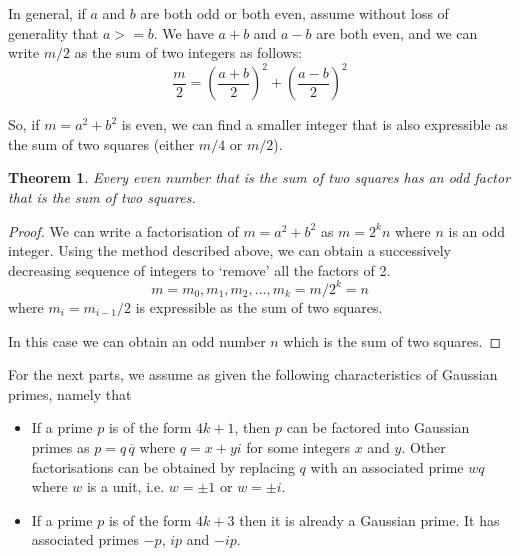 \documentclass[11pt]{amsart}
\newtheorem{theorem}{Theorem}[section]
\begin{document}
\vspace{1em}

In general, if $a$ and $b$ are both odd or both even, assume without loss of generality that $a >= b$. We have $a+b$ and $a-b$ are both even, and we can write $m/2$ as the sum of two integers as follows:
$$
\frac{m}{2} = \left(\frac{a+b}{2}\right)^2 + \left(\frac{a-b}{2}\right)^2
$$


\vspace{1em}

So, if $m = a^2 + b^2$ is even, we can find a smaller integer that is also expressible as the sum of two squares (either $m/4$ or $m/2$).


\vspace{1em}

\begin{theorem}
Every even number that is the sum of two squares has an odd factor that is the sum of two squares.
\end{theorem}

\begin{proof}
We can write a factorisation of $m = a^2 + b^2$ as $m = 2^k n$ where $n$ is an odd integer.
Using the method described above, we can obtain a successively decreasing sequence of integers to `remove' all the factors of 2.
$$
m = m_0 , m_1, m_2, \ldots, m_k = m/2^{k} =  n
$$
where $m_i = m_{i-1}/2$ is expressible as the sum of two squares.

In this case we can obtain an odd number $n$ which is the sum of two squares.
\end{proof}

\vspace{1em}

For the next parts, we assume as given the following characteristics of Gaussian primes, namely that
\begin{itemize}
\item
If a prime $p$ is of the form $4k+1$, then $p$ can be factored into Gaussian primes as $p = q \, \overline{q}$  where $q = x + y i$ for some integers $x$ and $y$. Other factorisations can be obtained by replacing $q$ with an associated prime $w q$ where $w$ is a unit, i.e. $w = \pm 1$ or $w = \pm i$.
\item
If a prime $p$ is of the form $4 k + 3$ then it is already a Gaussian prime. It has associated primes $-p$, $ip$ and $-ip$.
\end{itemize}


\vspace{1em}
\end{document}
